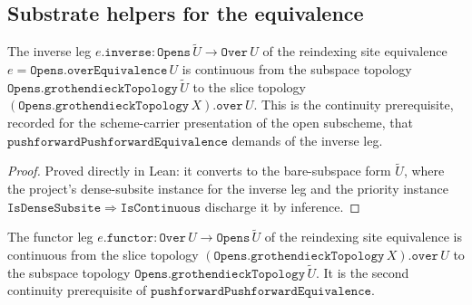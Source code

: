 \subsection{Substrate helpers for the equivalence}
\label{sec:soe_equivalence_helpers}

\begin{definition}\leanok
  \label{def:over_equiv_inverse_is_continuous}
  The inverse leg \(e.\mathtt{inverse} : \mathtt{Opens}\,\widetilde{U} \to
  \mathtt{Over}\,U\) of the reindexing site equivalence
  \(e = \mathtt{Opens.overEquivalence}\,U\) is continuous from the subspace
  topology \(\mathtt{Opens.grothendieckTopology}\,\widetilde{U}\) to the slice
  topology \((\mathtt{Opens.grothendieckTopology}\,X).\mathtt{over}\,U\). This is the
  continuity prerequisite, recorded for the scheme-carrier presentation of the
  open subscheme, that \(\mathtt{pushforwardPushforwardEquivalence}\) demands of the
  inverse leg.
\end{definition}

\begin{proof}

\leanok
  Proved directly in Lean: it converts to the bare-subspace form
  \(\widetilde{U}\), where the project's dense-subsite instance for the inverse leg
  and the priority instance \(\mathtt{IsDenseSubsite} \Rightarrow
  \mathtt{IsContinuous}\) discharge it by inference.
\end{proof}

\begin{definition}\leanok
  \label{def:over_equiv_functor_is_continuous}
  The functor leg \(e.\mathtt{functor} : \mathtt{Over}\,U \to
  \mathtt{Opens}\,\widetilde{U}\) of the reindexing site equivalence is continuous
  from the slice topology \((\mathtt{Opens.grothendieckTopology}\,X).\mathtt{over}\,U\)
  to the subspace topology \(\mathtt{Opens.grothendieckTopology}\,\widetilde{U}\). It
  is the second continuity prerequisite of
  \(\mathtt{pushforwardPushforwardEquivalence}\).
\end{definition}

